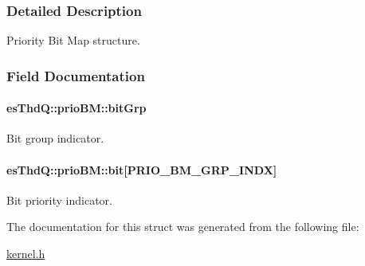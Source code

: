 \subsubsection{Detailed Description}
Priority Bit Map structure. 

\subsubsection{Field Documentation}
\hypertarget{structesThdQ_1_1prioBM_a8beff1a57efbada9bf00892b901e5dfb}{
\paragraph[{bit\-Grp}]{ es\-Thd\-Q\-::prio\-B\-M\-::bit\-Grp}}\label{structesThdQ_1_1prioBM_a8beff1a57efbada9bf00892b901e5dfb}


Bit group indicator. 

\hypertarget{structesThdQ_1_1prioBM_a62b0a673887a92104df88f7797c2d2fa}{
\paragraph[{bit}]{ es\-Thd\-Q\-::prio\-B\-M\-::bit\mbox{[}{\bf P\-R\-I\-O\-\_\-\-B\-M\-\_\-\-G\-R\-P\-\_\-\-I\-N\-D\-X}\mbox{]}}}\label{structesThdQ_1_1prioBM_a62b0a673887a92104df88f7797c2d2fa}


Bit priority indicator. 



The documentation for this struct was generated from the following file\-:\begin{DoxyCompactItemize}
\item 
\hyperlink{kernel_8h}{kernel.\-h}\end{DoxyCompactItemize}
